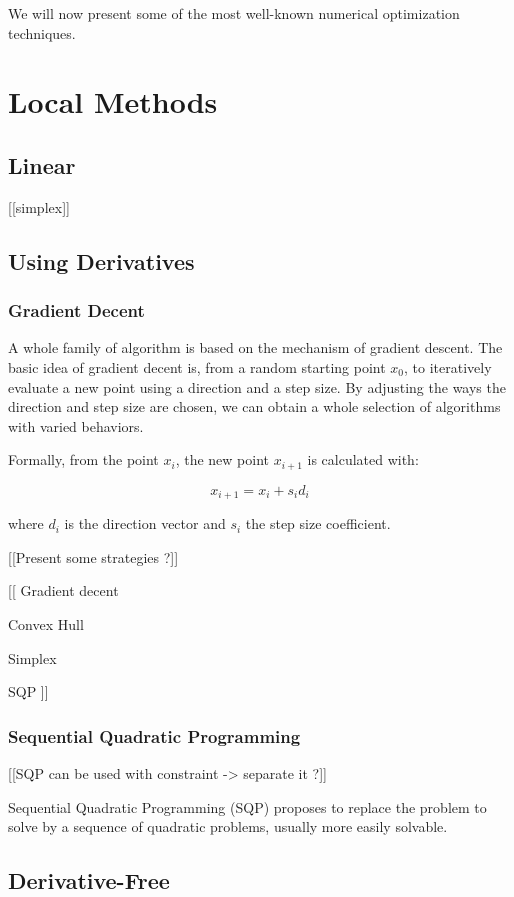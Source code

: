 We will now present some of the most well-known numerical optimization techniques.

\section{Local Methods}

\subsection{Linear}

[[simplex]]

\subsection{Using Derivatives}

\subsubsection{Gradient Decent}

A whole family of algorithm is based on the mechanism of gradient descent.
The basic idea of gradient decent is, from a random starting point $x_0$, to iteratively evaluate a new point using a direction and a step size.
By adjusting the ways the direction and step size are chosen, we can obtain a whole selection of algorithms with varied behaviors.

Formally, from the point $x_i$, the new point $x_{i+1}$ is calculated with:

\[ x_{i+1} = x_i +s_id_i \]

where $d_i$ is the direction vector and $s_i$ the step size coefficient.

[[Present some strategies ?]]


[[
Gradient decent

Convex Hull

Simplex

SQP
]]

\subsubsection{Sequential Quadratic Programming}
[[SQP can be used with constraint -> separate it ?]]

Sequential Quadratic Programming (SQP) proposes to replace the problem to solve by a sequence of quadratic problems, usually more easily solvable.

\subsection{Derivative-Free}

